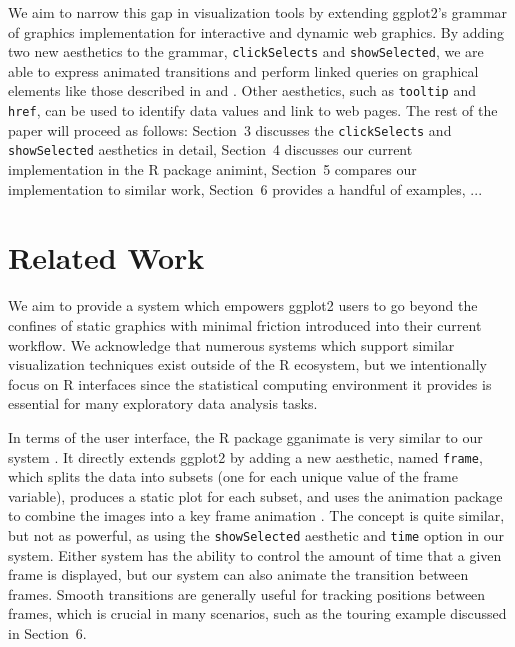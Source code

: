 \documentclass[journal]{vgtc}\usepackage[]{graphicx}\usepackage[]{color}
\begin{document}
We aim to narrow this gap in visualization tools by extending ggplot2's grammar of graphics implementation for interactive and dynamic web graphics. By adding two new aesthetics to the grammar, \texttt{clickSelects} and \texttt{showSelected}, we are able to express animated transitions and perform linked queries on graphical elements like those described in \citep{Ahlberg:1991} and \citep{Buja:1991vh}. Other aesthetics, such as \texttt{tooltip} and \texttt{href}, can be used to identify data values and link to web pages. The rest of the paper will proceed as follows: Section~3 discusses the \texttt{clickSelects} and \texttt{showSelected} aesthetics in detail, Section~4 discusses our current implementation in the R package animint, Section~5 compares our implementation to similar work, Section~6 provides a handful of examples, ...


\section{Related Work}

We aim to provide a system which empowers ggplot2 users to go beyond the confines of static graphics with minimal friction introduced into their current workflow. We acknowledge that numerous systems which support similar visualization techniques exist outside of the R ecosystem, but we intentionally focus on R interfaces since the statistical computing environment it provides is essential for many exploratory data analysis tasks.

In terms of the user interface, the R package gganimate is very similar to our system \citep{gganimate}. It directly extends ggplot2 by adding a new aesthetic, named \texttt{frame}, which splits the data into subsets (one for each unique value of the frame variable), produces a static plot for each subset, and uses the animation package to combine the images into a key frame animation \citep{animation}. The concept is quite similar, but not as powerful, as using the \texttt{showSelected} aesthetic and \texttt{time} option in our system. Either system has the ability to control the amount of time that a given frame is displayed, but our system can also animate the transition between frames. Smooth transitions are generally useful for tracking positions between frames, which is crucial in many scenarios, such as the touring example discussed in Section~6.
\end{document}
